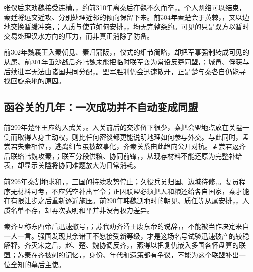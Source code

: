 张仪后来劝魏接受连横，，约前310年离秦后在魏不久而卒，。个人网络可以结束，秦廷将远交近攻、分别处理近邻的倾向保留下来。前304年秦楚会于黄棘，，又以边地交换暂缓冲突，；人质与使节如何安排，，均无完整条约。可见的只是双方以暂时交易处理汉水方向的压力，而非真正消除了防备。

前302年魏襄王入秦朝见、秦归蒲阪，，仪式的细节简略，却把军事强制转成可见的从属。前301年垂沙战后齐韩魏未能把临时联军变为常设反楚同盟，；城邑、俘获与后续进军无法由诸国共同分配，。盟军胜利仍会迅速散开，正是楚与秦各自仍能寻找回旋余地的原因。

\subsection{函谷关的几年：一次成功并不自动变成同盟}

前299年楚怀王应约入武关，。入关前后的交涉留下很少，秦把会盟地点放在关隘一侧而取得人身主动权，则比任何密谈都更能说明地理如何参与外交。与此同时，孟尝君失秦相位，，逃离细节虽被故事化，齐秦关系由此趋向公开对抗。孟尝君返齐后联络韩魏攻秦，；联军分段供粮、协同前锋，，从现存材料不能还原为完整补给表，却显示关隘将协同难题放大为日常消耗。

前296年秦割地求和，，三国的持续攻势停止；久役兵员归国、边城待修，。复员程序无材料可考，不应凭空补出军令；正因联盟必须把人和粮还给各自国家，秦才能在有限让步之后重新逐近施压。前290年韩魏割地时的朝见、质任等从属安排，，人质名单不存，却再次表明和平并非没有权力差异。

秦齐互称东西帝后迅速撤号，；苏代劝齐湣王废东帝的说辞，，不能被当作决定来自一人一言。强国发现其余诸王不愿接受新等级，才是这场名号试验迅速破产的较稳解释。齐灭宋之后，赵、楚、魏协调反齐，，燕得以把复仇嵌入多国各怀盘算的联盟；苏秦在齐被刺的记忆，，身份、年代和遗策都有争议，不能为这个联盟补出一位全知的幕后主使。

